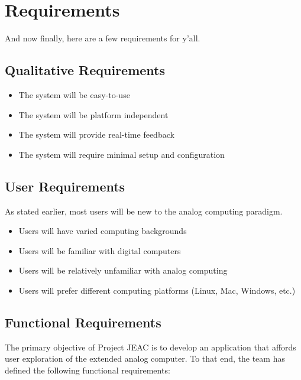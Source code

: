 \chapter{Requirements}
And now finally, here are a few requirements for y'all.

\section{Qualitative Requirements}

\begin{itemize}
	\item The system will be easy-to-use
	\item The system will be platform independent
	\item The system will provide real-time feedback
	\item The system will require minimal setup and configuration
\end{itemize}

\section{User Requirements}

As stated earlier, most users will be new to the analog computing paradigm.

\begin{itemize}
	\item Users will have varied computing backgrounds
	\item Users will be familiar with digital computers
	\item Users will be relatively unfamiliar with analog computing
	\item Users will prefer different computing platforms (Linux, Mac, Windows, etc.)
\end{itemize}

\section{Functional Requirements}

The primary objective of Project JEAC is to develop an application that affords user exploration of the extended analog computer.  To that end, the team has defined the following functional requirements:

